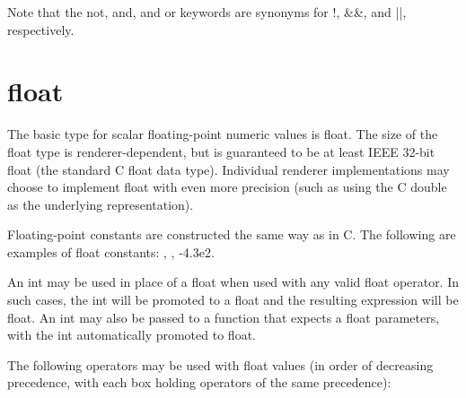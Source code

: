\documentclass[11pt,letterpaper]{book}
\def\float{{\cf float}\xspace}
\def\inttype{{\cf int}\xspace}
\begin{document}
\medskip

\noindent Note that the {\cf not}, {\cf and}, and {\cf or} keywords are
synonyms for {\cf !}, {\cf \&\&}, and {\cf ||}, respectively.



\section{{\cf float}}
\label{sec:types:float}
 

The basic type for scalar floating-point numeric values is \float.  The
size of the {\cf float} type is renderer-dependent, but is guaranteed to
be at least IEEE 32-bit float (the standard C \float data type).
Individual renderer implementations may choose to implement \float with
even more precision (such as using the C {\cf double} as the underlying
representation).

Floating-point constants are constructed the same way as in C.
The following are examples of {\cf float} constants:  {},
{}, {\cf -4.3e2}.

An \inttype may be used in place of a \float when used with any valid
\float operator.  In such cases, the \inttype will be promoted to a
\float and the resulting expression will be \float.  An \inttype may
also be passed to a function that expects a \float parameters, with the
\inttype automatically promoted to \float.

The following operators may be used with \float values (in order of
decreasing precedence, with each box holding operators of the same
precedence):

\medskip
\end{document}
